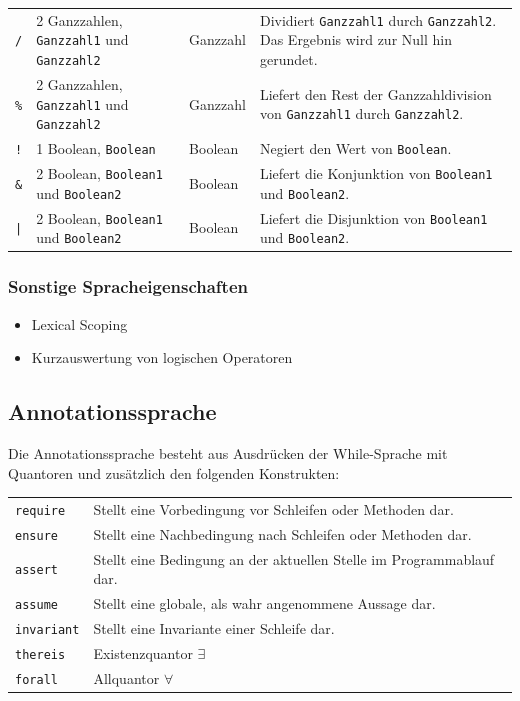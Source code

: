 \documentclass[a4paper,10pt]{article}
\begin{document}
\begin{tabularx}{\textwidth}{| l | X | l | X |}
\texttt{/} & 2 Ganzzahlen, \texttt{Ganzzahl1} und \texttt{Ganzzahl2} & Ganzzahl & Dividiert \texttt{Ganzzahl1} durch \texttt{Ganzzahl2}. Das Ergebnis wird zur Null hin gerundet.\\
\texttt{\%} & 2 Ganzzahlen, \texttt{Ganzzahl1} und \texttt{Ganzzahl2} & Ganzzahl & Liefert den Rest der Ganzzahldivision von \texttt{Ganzzahl1} durch \texttt{Ganzzahl2}.\\
\hline
\texttt{!} & 1 Boolean, \texttt{Boolean} & Boolean & Negiert den Wert von \texttt{Boolean}.\\
\texttt{\&} & 2 Boolean, \texttt{Boolean1} und \texttt{Boolean2} & Boolean & Liefert die Konjunktion von \texttt{Boolean1} und \texttt{Boolean2}.\\
\texttt{|} & 2 Boolean, \texttt{Boolean1} und \texttt{Boolean2} & Boolean & Liefert die Disjunktion von \texttt{Boolean1} und \texttt{Boolean2}.\\
\hline
\end{tabularx}
\subsubsection{Sonstige Spracheigenschaften}
\begin{itemize}
  \item Lexical Scoping
  \item Kurzauswertung von logischen Operatoren
\end{itemize}

\subsection{Annotationssprache}
Die Annotationssprache besteht aus Ausdr\"{u}cken der While-Sprache mit Quantoren und zus\"{a}tzlich den folgenden Konstrukten:\\
\begin{tabularx}{\textwidth}{| l | X |}
\hline
\texttt{require} & Stellt eine Vorbedingung vor Schleifen oder Methoden dar.\\
\texttt{ensure} & Stellt eine Nachbedingung nach Schleifen oder Methoden dar.\\
\texttt{assert} & Stellt eine Bedingung an der aktuellen Stelle im Programmablauf dar.\\
\texttt{assume} & Stellt eine globale, als wahr angenommene Aussage dar.\\
\texttt{invariant} & Stellt eine Invariante einer Schleife dar.\\
\hline
\texttt{thereis} & Existenzquantor $\exists$\\
\texttt{forall} & Allquantor $\forall$\\
\hline
\end{tabularx}
\end{document}
